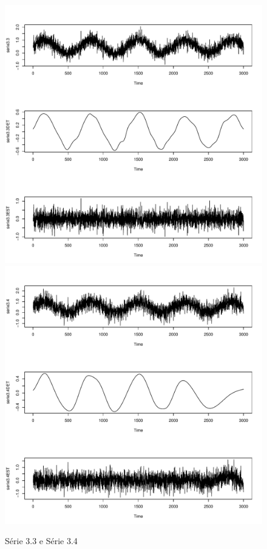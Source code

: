 \graphicspath{{imagens/}}
\begin{figure}[H]
\begin{center}
  \includegraphics[scale=0.43]{serie3_3.pdf} \quad
  \includegraphics[scale=0.43]{serie3_4.pdf}
  \caption{Série 3.3 e Série 3.4}

\end{center}
\end{figure}

